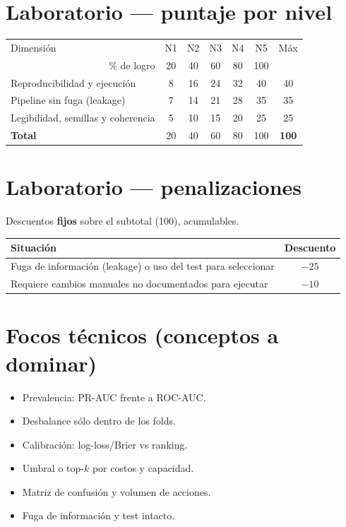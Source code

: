 \documentclass[11pt,letterpaper]{article}
\begin{document}
\section*{Laboratorio --- puntaje por nivel}
\begin{center}\small
\begin{tabular}{l ccccc c}
\toprule
Dimensión & N1 & N2 & N3 & N4 & N5 & Máx \\
\multicolumn{1}{r}{\footnotesize \% de logro} & 20 & 40 & 60 & 80 & 100 & \\
\midrule
Reproducibilidad y ejecución & 8 & 16 & 24 & 32 & 40 & 40 \\
Pipeline sin fuga (leakage) & 7 & 14 & 21 & 28 & 35 & 35 \\
Legibilidad, semillas y coherencia & 5 & 10 & 15 & 20 & 25 & 25 \\
\midrule
\textbf{Total} & 20 & 40 & 60 & 80 & 100 & \textbf{100} \\
\bottomrule
\end{tabular}\end{center}
\section*{Laboratorio --- penalizaciones}
Descuentos \textbf{fijos} sobre el subtotal (100), acumulables.
\begin{center}\small
\begin{tabular}{p{11cm} c}
\toprule
Situación & Descuento \\
\midrule
Fuga de información (leakage) o uso del test para seleccionar & $-25$ \\
Requiere cambios manuales no documentados para ejecutar & $-10$ \\
\bottomrule
\end{tabular}\end{center}
\section*{Focos técnicos (conceptos a dominar)}
\begin{itemize}
\item Prevalencia: PR-AUC frente a ROC-AUC.
\item Desbalance sólo dentro de los folds.
\item Calibración: log-loss/Brier vs ranking.
\item Umbral o top-$k$ por costos y capacidad.
\item Matriz de confusión y volumen de acciones.
\item Fuga de información y test intacto.
\end{itemize}
\end{document}
